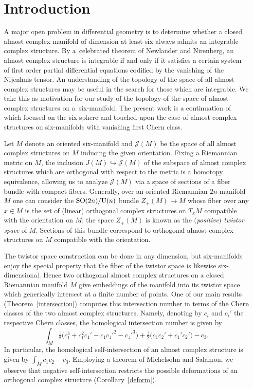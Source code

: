 \documentclass[pdftex]{sigma}%
\numberwithin{equation}{section}
\begin{document}
\section{Introduction}

A major open problem in differential geometry is to determine whether a closed almost complex manifold of dimension at least six always admits an integrable complex structure. By a~celebrated theorem of Newlander and Nirenberg, an almost complex structure is integrable if and only if it satisfies a certain system of first order partial differential equations codified by the vanishing of the Nijenhuis tensor. An understanding of the topology of the space of all almost complex structures may be useful in the search for those which are integrable. We take this as motivation for our study of the topology of the space of almost complex structures on a~six-manifold. The present work is a continuation of~\cite{FGM21} which focused on the six-sphere and touched upon the case of almost complex structures on six-manifolds with vanishing first Chern class.

Let $M$ denote an oriented six-manifold and $\mathcal J(M)$ be the space of
all almost complex structures on $M$ inducing the given orientation.
Fixing a Riemannian metric on $M$, the inclusion $J(M) \hookrightarrow \mathcal J(M)$ of the subspace of almost complex structures which are orthogonal with respect to the metric is a homotopy equivalence, allowing us to analyze $\mathcal J(M)$ via a space of sections of a fiber bundle with compact fibers. Generally, over an oriented Riemannian $2n$-manifold $M$ one can consider the ${\rm SO}(2n)/{\rm U}(n)$ bundle
$Z_+(M) \to M$ whose fiber over any $x \in M$ is the set of (linear) orthogonal complex structures on $T_x M$ compatible with the orientation on $M$; the space $Z_+(M)$ is known as the \emph{$($positive$)$ twistor space} of $M$. Sections of this bundle correspond to orthogonal almost complex structures on $M$ compatible with the orientation.

The twistor space construction can be done in any dimension, but six-manifolds enjoy the special property that the fiber of the twistor space is likewise six-dimensional. Hence two orthogonal almost complex structures on a closed Riemannian manifold $M$ give embeddings of the manifold into its twistor space which generically intersect at a finite number of points. One of our main results (Theorem~\ref{intersection}) computes this intersection number in terms of the Chern classes of the two almost complex structures. Namely, denoting by $c_i$ and $c_i'$ the respective Chern classes, the homological intersection number is given by
\[ \int_M \tfrac{1}{8}\big( c_1^3 + c_1^2 c_1' - c_1c_1'^2 - c_1'^3 \big) + \tfrac{1}{2} \big( c_1 c_2' + c_1' c_2' \big) - c_3.\]
In particular, the homological self-intersection of an almost complex structure is given by $\int_M c_1c_2 - c_3$. Employing a theorem of Michelsohn and Salamon, we observe that negative self-intersection restricts the possible deformations of an orthogonal complex structure (Corollary~\ref{deform}).
\end{document}
